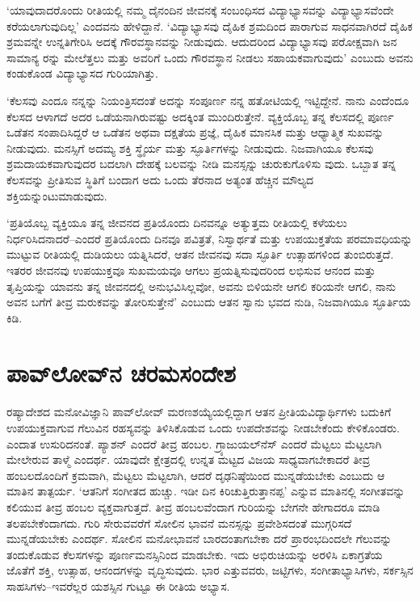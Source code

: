 ‘ಯಾವುದಾದರೊಂದು ರೀತಿಯಲ್ಲಿ ನಮ್ಮ ದೈನಂದಿನ ಜೀವನಕ್ಕೆ ಸಂಬಂಧಿಸದ ವಿದ್ಯಾಭ್ಯಾಸವನ್ನು ವಿದ್ಯಾಭ್ಯಾಸವೆಂದೇ ಕರೆಯಲಾಗುವುದಿಲ್ಲ’ ಎಂದವನು ಹೇಳಿದ್ದಾನೆ. ‘ವಿದ್ಯಾಭ್ಯಾಸವು ದೈಹಿಕ ಶ್ರಮದಿಂದ ಪಾರಾಗುವ ಸಾಧನವಾಗಿರದೆ ದೈಹಿಕ ಶ್ರಮವನ್ನೇ ಉನ್ನತಿಗೇರಿಸಿ ಅದಕ್ಕೆ ಗೌರವಸ್ಥಾನವನ್ನು ನೀಡುವುದು. ಆದುದರಿಂದ ವಿದ್ಯಾಭ್ಯಾಸವು ಪರೋಕ್ಷವಾಗಿ ಜನ ಸಾಮಾನ್ಯ ರನ್ನು ಮೇಲೆತ್ತಲು ಮತ್ತು ಅವರಿಗೆ ಒಂದು ಗೌರವಸ್ಥಾನ ನೀಡಲು ಸಹಾಯಕವಾಗುವುದು’ ಎಂಬುದು ಅವನು ಕಂಡುಕೊಂಡ ವಿದ್ಯಾಭ್ಯಾಸದ ಗುರಿಯಾಗಿತ್ತು.

‘ಕೆಲಸವು ಎಂದೂ ನನ್ನನ್ನು ನಿಯಂತ್ರಿಸದಂತೆ ಅದನ್ನು ಸಂಪೂರ್ಣ ನನ್ನ ಹತೋಟಿಯಲ್ಲಿ ಇಟ್ಟಿದ್ದೇನೆ. ನಾನು ಎಂದೆಂದೂ ಕೆಲಸದ ಆಳಾಗದೆ ಅದರ ಒಡೆಯನಾಗಿರುವಷ್ಟು ಅದಕ್ಕಿಂತ ಮುಂದಿರುತ್ತೇನೆ. ವ್ಯಕ್ತಿಯೊಬ್ಬ ತನ್ನ ಕೆಲಸದಲ್ಲಿ ಪೂರ್ಣ ಒಡೆತನ ಸಂಪಾದಿಸಿದ್ದರೆ ಆ ಒಡೆತನ ಅಥವಾ ದಕ್ಷತೆಯ ಪ್ರಜ್ಞೆ, ದೈಹಿಕ ಮಾನಸಿಕ ಮತ್ತು ಆಧ್ಯಾತ್ಮಿಕ ಸುಖವನ್ನು ನೀಡುವುದು. ಮನಸ್ಸಿಗೆ ಅದಮ್ಯ ಶಕ್ತಿ ಸ್ಥೈರ್ಯ ಮತ್ತು ಸ್ಫೂರ್ತಿಗಳನ್ನು ನೀಡುವುದು. ನಿಜವಾಗಿಯೂ ಕೆಲಸವು ಶ್ರಮದಾಯಕವಾಗುವುದರ ಬದಲಾಗಿ ದೇಹಕ್ಕೆ ಬಲವನ್ನು ನೀಡಿ ಮನಸ್ಸನ್ನು ಚುರುಕುಗೊಳಿಸು ವುದು. ಒಬ್ಬಾತ ತನ್ನ ಕೆಲಸವನ್ನು ಪ್ರೀತಿಸುವ ಸ್ಥಿತಿಗೆ ಬಂದಾಗ ಅದು ಒಂದು ತೆರನಾದ ಅತ್ಯಂತ ಹೆಚ್ಚಿನ ಮೌಲ್ಯದ ಶಕ್ತಿಯನ್ನುಂಟುಮಾಡುವುದು.

‘ಪ್ರತಿಯೊಬ್ಬ ವ್ಯಕ್ತಿಯೂ ತನ್ನ ಜೀವನದ ಪ್ರತಿಯೊಂದು ದಿನವನ್ನೂ ಅತ್ಯುತ್ತಮ ರೀತಿಯಲ್ಲಿ ಕಳೆಯಲು ನಿರ್ಧರಿಸಿದನಾದರೆ–ಎಂದರೆ ಪ್ರತಿಯೊಂದು ದಿನವೂ ಪವಿತ್ರತೆ, ನಿಸ್ವಾರ್ಥತೆ ಮತ್ತು ಉಪಯುಕ್ತತೆಯ ಪರಮಾವಧಿಯನ್ನು ಮುಟ್ಟುವ ರೀತಿಯಲ್ಲಿ ದುಡಿಯಲು ಯತ್ನಿಸಿದರೆ, ಆತನ ಜೀವನವು ಸದಾ ಸ್ಫೂರ್ತಿ ಉತ್ಸಾಹಗಳಿಂದ ತುಂಬಿರುತ್ತದೆ. ಇತರರ ಜೀವನವು ಉಪಯುಕ್ತವೂ ಸುಖಮಯವೂ ಆಗಲು ಪ್ರಯತ್ನಿಸುವುದರಿಂದ ಲಭಿಸುವ ಆನಂದ ಮತ್ತು ತೃಪ್ತಿಯನ್ನು ಯಾವನು ತನ್ನ ಜೀವನದಲ್ಲಿ ಅನುಭವಿಸಿಲ್ಲವೋ, ಅವನು ಬಿಳಿಯನೇ ಆಗಲಿ ಕರಿಯನೇ ಆಗಲಿ, ನಾನು ಅವನ ಬಗೆಗೆ ತೀವ್ರ ಮರುಕವನ್ನು ತೋರಿಸುತ್ತೇನೆ’ ಎಂಬುದು ಆತನ ಸ್ವಾನು ಭವದ ನುಡಿ, ನಿಜವಾಗಿಯೂ ಸ್ಫೂರ್ತಿಯ ಕಿಡಿ.


\section*{ಪಾವ್​ಲೋವ್​ನ ಚರಮಸಂದೇಶ}

\vskip -6pt

ರಷ್ಯಾದೇಶದ ಮನೋವಿಜ್ಞಾನಿ ಪಾವ್​ಲೋವ್ ಮರಣಶಯ್ಯೆಯಲ್ಲಿದ್ದಾಗ ಆತನ ಪ್ರೀತಿಯ\break ವಿದ್ಯಾರ್ಥಿಗಳು ಬದುಕಿಗೆ ಉಪಯುಕ್ತವಾಗುವ ಗೆಲುವಿನ ರಹಸ್ಯವನ್ನು ತಿಳಿಸಿಕೊಡುವ ಒಂದು ಉಪದೇಶವನ್ನು ನೀಡಬೇಕೆಂದು ಕೇಳಿಕೊಂಡರು.  ಎಂದಾತ ಉಸುರಿದನಂತೆ. ಪ್ಯಾಶನ್ ಎಂದರೆ ತೀವ್ರ ಹಂಬಲ. ಗ್ರ್ಯಾಜುಯಲ್​ನೆಸ್ ಎಂದರೆ ಮೆಟ್ಟಲು ಮೆಟ್ಟಲಾಗಿ ಮೇಲೇರುವ ತಾಳ್ಮೆ ಎಂದರ್ಥ. ಯಾವುದೇ ಕ್ಷೇತ್ರದಲ್ಲಿ ಉನ್ನತ ಮಟ್ಟದ ವಿಜಯ ಸಾಧ್ಯವಾಗಬೇಕಾದರೆ ತೀವ್ರ ಹಂಬಲದೊಂದಿಗೆ ಕ್ರಮವಾಗಿ, ಮೆಟ್ಟಲು ಮೆಟ್ಟಲಾಗಿ, ಆದರೆ ದೃಢನಿಷ್ಠೆಯಿಂದ ಮುನ್ನಡೆಯಬೇಕು ಎಂಬುದು ಆ ಮಾತಿನ ತಾತ್ಪರ್ಯ. ‘ಆತನಿಗೆ ಸಂಗೀತದ ಹುಚ್ಚು. ಇಡೀ ದಿನ ಕಿರಿಚುತ್ತಿರುತ್ತಾನಪ್ಪ’ ಎನ್ನುವ ಮಾತಿನಲ್ಲಿ ಸಂಗೀತವನ್ನು ಕಲಿಯುವ ತೀವ್ರ ಹಂಬಲ ವ್ಯಕ್ತವಾಗುತ್ತದೆ. ತೀವ್ರ ಹಂಬಲವೆಂದಾಗ ಗುರಿಯನ್ನು ಬೇಗನೇ ಹೇಗಾದರೂ ಮಾಡಿ ತಲಪಬೇಕೆಂದಾಗದು. ಗುರಿ ಸೇರುವವರೆಗೆ ಸೋಲಿನ ಭಾವನೆ ಮನಸ್ಸನ್ನು ಪ್ರವೇಶಿಸದಂತೆ ಮುಗ್ಗರಿಸದೆ ಮುನ್ನಡೆಯಬೇಕು ಎಂದರ್ಥ. ಸೋಲಿನ ಮನೋಭಾವನೆ ಬಾರದಂತಾಗಬೇಕಾ ದರೆ ಪ್ರಾರಂಭದಿಂದಲೇ ಗೆಲುವನ್ನು ತಂದುಕೊಡುವ ಕೆಲಸಗಳನ್ನು ಪೂರ್ಣಮನಸ್ಸಿನಿಂದ ಮಾಡಬೇಕು. ಇದು ಅಭಿರುಚಿಯನ್ನು ಅರಳಿಸಿ ಏಕಾಗ್ರತೆಯ ಜೊತೆಗೆ ಶಕ್ತಿ, ಉತ್ಸಾಹ, ಆನಂದಗಳನ್ನು ವೃದ್ಧಿಸುವುದು. ಭಾರ ಎತ್ತುವವರು, ಜಟ್ಟಿಗಳು, ಸಂಗೀತಾಭ್ಯಾಸಿಗಳು, ಸರ್ಕಸ್ಸಿನ ಸಾಹಸಿಗಳು–ಇವರೆಲ್ಲರ ಯಶಸ್ಸಿನ ಗುಟ್ಟೂ ಈ ರೀತಿಯ ಅಭ್ಯಾಸ.


